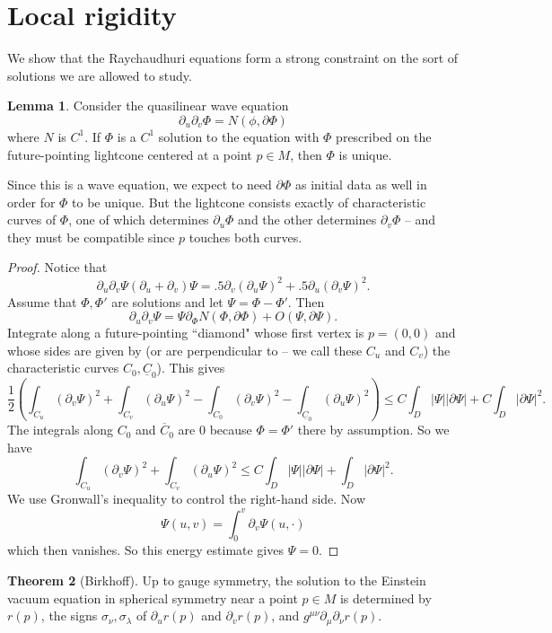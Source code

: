 \documentclass[12pt]{report}
\theoremstyle{definition}
\newtheorem{theorem}{Theorem}[chapter]
\newtheorem{lemma}[theorem]{Lemma}
\begin{document}
\section{Local rigidity}
We show that the Raychaudhuri equations form a strong constraint on the sort of solutions we are allowed to study.
\begin{lemma}
    Consider the quasilinear wave equation
    $$\partial_u\partial_v \Phi = N(\phi, \partial \Phi)$$
    where $N$ is $C^1$. If $\Phi$ is a $C^1$ solution to the equation with $\Phi$ prescribed on the future-pointing lightcone centered at a point $p \in M$, then $\Phi$ is unique.
\end{lemma}
Since this is a wave equation, we expect to need $\partial \Phi$ as initial data as well in order for $\Phi$ to be unique. But the lightcone consists exactly of characteristic curves of $\Phi$, one of which determines $\partial_u \Phi$ and the other determines $\partial_v \Phi$ -- and they must be compatible since $p$ touches both curves.
\begin{proof}
    Notice that
    $$\partial_u \partial_v \Psi (\partial_u + \partial_v) \Psi = .5 \partial_v(\partial_u \Psi)^2 + .5 \partial_u(\partial_v \Psi)^2.$$
    Assume that $\Phi, \Phi'$ are solutions and let $\Psi = \Phi - \Phi'$. Then
    $$\partial_u \partial_v \Psi = \Psi\partial_\Phi N(\Phi, \partial \Phi) +  O(\Psi, \partial \Psi).$$
    Integrate along a future-pointing ``diamond" whose first vertex is $p = (0, 0)$ and whose sides are given by (or are perpendicular to -- we call these $C_u$ and $C_v$) the characteristic curves $C_0, \underline C_0$). This gives
$$\frac{1}{2}\left(\int_{C_u} (\partial_v \Psi)^2 + \int_{C_v} (\partial_u \Psi)^2  - \int_{C_0} (\partial_v \Psi)^2 - \int_{\underline C_0} (\partial_u \Psi)^2 \right) \leq C \int_D |\Psi| |\partial \Psi| + C\int_D |\partial \Psi|^2.$$
    The integrals along $C_0$ and $\overline C_0$ are $0$ because $\Phi = \Phi'$ there by assumption. So we have
    $$\int_{C_u} (\partial_v \Psi)^2 + \int_{C_v} (\partial_u \Psi)^2 \leq C \int_D |\Psi| |\partial \Psi| + \int_D |\partial \Psi|^2.$$
    We use Gronwall's inequality to control the right-hand side.
    Now
    $$\Psi(u, v) = \int_0^v \partial_v \Psi(u, \cdot)$$
    which then vanishes. So this energy estimate gives $\Psi = 0$.
\end{proof}
\begin{theorem}[Birkhoff]
    Up to gauge symmetry, the solution to the Einstein vacuum equation in spherical symmetry near a point $p \in M$ is determined by $r(p)$, the signs $\sigma_\nu, \sigma_\lambda$ of $\partial_u r(p)$ and $\partial_v r(p)$, and $g^{\mu\nu} \partial_\mu \partial_\nu r(p)$.
\end{theorem}
\end{document}
